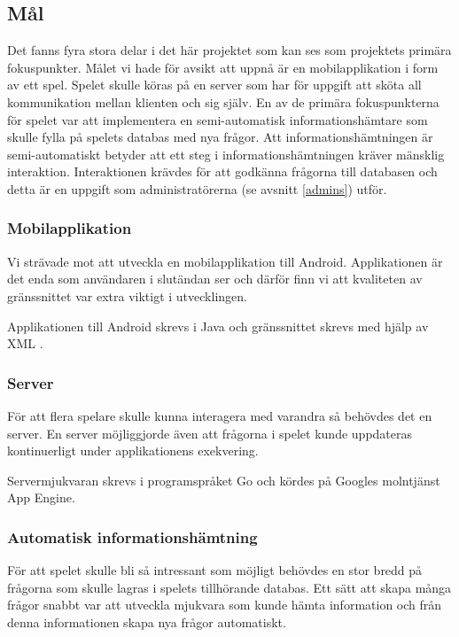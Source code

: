 \documentclass[a4paper, 11pt]{article}
\begin{document}
\subsection{Mål}
Det fanns fyra stora delar i det här projektet som kan ses som projektets primära fokuspunkter. Målet vi hade för avsikt att uppnå är en mobilapplikation i form av ett spel. Spelet skulle köras på en server som har för uppgift att sköta all kommunikation mellan klienten och sig själv. En av de primära fokuspunkterna för spelet var att implementera en semi-automatisk informationshämtare som skulle fylla på spelets databas med nya frågor. Att informationshämtningen är semi-automatiskt betyder att ett steg i informationshämtningen kräver mänsklig interaktion. Interaktionen krävdes för att godkänna frågorna till databasen och detta är en uppgift som administratörerna (se avsnitt \ref{admins}) utför. 


\subsubsection{Mobilapplikation}
Vi strävade mot att utveckla en mobilapplikation till Android. Applikationen är det enda som användaren i slutändan ser och därför finn vi att kvaliteten av gränssnittet var extra viktigt i utvecklingen. 

Applikationen till Android skrevs i Java och gränssnittet skrevs med hjälp av XML \cite{xml}. 

\subsubsection{Server}
För att flera spelare skulle kunna interagera med varandra så behövdes det en server. En server möjliggjorde även att frågorna i spelet kunde uppdateras kontinuerligt under applikationens exekvering.

Servermjukvaran skrevs i programspråket Go \cite{golang} och kördes på Googles molntjänst App Engine.

\subsubsection{Automatisk informationshämtning}
För att spelet skulle bli så intressant som möjligt behövdes en stor bredd på frågorna som skulle lagras i spelets tillhörande databas. Ett sätt att skapa många frågor snabbt var att utveckla mjukvara som kunde hämta information och från denna informationen skapa nya frågor automatiskt. 
\end{document}
